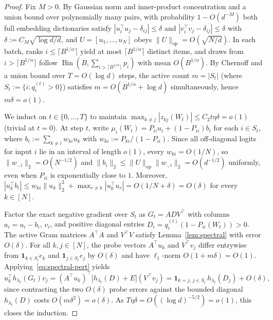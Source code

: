 \documentclass[11pt]{article}
\theoremstyle{plain}
\theoremstyle{definition}
\theoremstyle{remark}
\DeclareMathOperator{\Bin}{Bin}
\begin{document}
\begin{proof}
Fix $M > 0$. By Gaussian norm and inner-product concentration and a union bound over polynomially many pairs, with probability $1 - O(d^{-M})$ both full embedding dictionaries satisfy $|u_i^\top u_j - \delta_{ij}| \le \delta$ and $|v_i^\top v_j - \delta_{ij}| \le \delta$ with $\delta := C_M\sqrt{\log d / d}$, and $U = [u_1,\dots,u_N]$ obeys $\|U\|_{\mathrm{op}} = O(\sqrt{N/d})$.
In each batch, ranks $i \le \lceil B^{1/\alpha}\rceil$ yield at most $\lceil B^{1/\alpha}\rceil$ distinct items, and draws from $i > \lceil B^{1/\alpha}\rceil$ follow $\Bin(B, \sum_{i > \lceil B^{1/\alpha}\rceil} p_i)$ with mean $O(B^{1/\alpha})$.
By Chernoff and a union bound over $T = O(\log d)$ steps, the active count $m = |S_t|$ (where $S_t := \{i : q_i^{(t)} > 0\}$) satisfies $m = O(B^{1/\alpha} + \log d)$ simultaneously, hence $m\delta = o(1)$.

We induct on $t \in \{0, \dots, T\}$ to maintain $\max_{k \neq j} |z_{kj}(W_t)| \le C_2 t\eta\delta = o(1)$ (trivial at $t = 0$).
At step $t$, write $\mu_i(W_t) = P_{ii} u_i + (1 - P_{ii}) b_i$ for each $i \in S_t$, where $b_i := \sum_{k \neq i} w_{ki} u_k$ with $w_{ki} := P_{ki}/(1 - P_{ii})$.
Since all off-diagonal logits for input $i$ lie in an interval of length $o(1)$, every $w_{ki} = O(1/N)$, so $\|w_{\cdot,i}\|_2 = O(N^{-1/2})$ and $\|b_i\|_2 \le \|U\|_{\mathrm{op}}\|w_{\cdot,i}\|_2 = O(d^{-1/2})$ uniformly, even when $P_{ii}$ is exponentially close to $1$.
Moreover, $|u_k^\top b_i| \le w_{ki}\|u_k\|_2^2 + \max_{r \neq k}|u_k^\top u_r| = O(1/N + \delta) = O(\delta)$ for every $k \in [N]$.

Factor the exact negative gradient over $S_t$ as $G_t = A D V^\top$ with columns $a_i = u_i - b_i$, $v_i$, and positive diagonal entries $D_i = q_i^{(t)}(1 - P_{ii}(W_t)) > 0$.
The active Gram matrices $A^\top A$ and $V^\top V$ satisfy Lemma~\ref{lem:spectral} with error $O(\delta)$.
For all $k, j \in [N]$, the probe vectors $A^\top u_k$ and $V^\top v_j$ differ entrywise from $\mathbf{1}_{k \in S_t} e_k$ and $\mathbf{1}_{j \in S_t} e_j$ by $O(\delta)$ and have $\ell_1$-norm $O(1 + m\delta) = O(1)$.
Applying~\eqref{eq:spectral-pert} yields
\[
u_k^\top h_{\lambda_t}(G_t) v_j
= (A^\top u_k)^\top \bigl[h_{\lambda_t}(D) + E\bigr](V^\top v_j)
= \mathbf{1}_{k=j,\, j \in S_t}\, h_{\lambda_t}(D_j) + O(\delta),
\]
since contracting the two $O(\delta)$ probe errors against the bounded diagonal $h_{\lambda_t}(D)$ costs $O(m\delta^2) = o(\delta)$.
As $T\eta\delta = O((\log d)^{-5/2}) = o(1)$, this closes the induction.


\end{proof}
\end{document}
